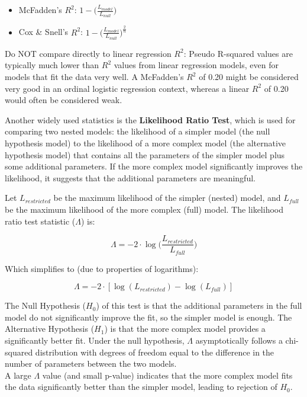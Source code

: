 \documentclass[
  letterpaper,
  DIV=11,
  numbers=noendperiod]{scrartcl}
\begin{document}
\begin{itemize}
\item
  McFadden's \(R^2\): \(1−\Big(\frac{L_{model}}{L_{null}}\Big)\)
\item
  Cox \& Snell's \(R^2\):
  \(1−\Big(\frac{L_{model}}{L_{null}}\Big)^{\frac{2}{n}}\)
\end{itemize}

\begin{tcolorbox}[enhanced jigsaw, opacitybacktitle=0.6, toptitle=1mm, title=\textcolor{quarto-callout-warning-color}{\faExclamationTriangle}\hspace{0.5em}{Warning}, coltitle=black, colframe=quarto-callout-warning-color-frame, titlerule=0mm, breakable, left=2mm, bottomtitle=1mm, arc=.35mm, colback=white, rightrule=.15mm, colbacktitle=quarto-callout-warning-color!10!white, toprule=.15mm, opacityback=0, leftrule=.75mm, bottomrule=.15mm]

Do NOT compare directly to linear regression \(R^2\): Pseudo R-squared
values are typically much lower than \(R^2\) values from linear
regression models, even for models that fit the data very well. A
McFadden's \(R^2\) of 0.20 might be considered very good in an ordinal
logistic regression context, whereas a linear \(R^2\) of 0.20 would
often be considered weak.

\end{tcolorbox}

Another widely used statistics is the \textbf{Likelihood Ratio Test},
which is used for comparing two nested models: the likelihood of a
simpler model (the null hypothesis model) to the likelihood of a more
complex model (the alternative hypothesis model) that contains all the
parameters of the simpler model plus some additional parameters. If the
more complex model significantly improves the likelihood, it suggests
that the additional parameters are meaningful.

Let \(L_{restricted}\) be the maximum likelihood of the simpler (nested)
model, and \(L_{full}\) be the maximum likelihood of the more complex
(full) model. The likelihood ratio test statistic (\(\Lambda\)) is:

\[
\Lambda = - 2 \cdot \log \Bigg(\frac{L_{restricted}}{L_{full}}\Bigg)
\]

Which simplifies to (due to properties of logarithms):

\[
\Lambda = -2 \cdot [\log(L_{restricted})-\log(L_{full})]
\]

The Null Hypothesis (\(H_0\)) of this test is that the additional
parameters in the full model do not significantly improve the fit, so
the simpler model is enough. The Alternative Hypothesis (\(H_1\)) is
that the more complex model provides a significantly better fit. Under
the null hypothesis, \(\Lambda\) asymptotically follows a chi-squared
distribution with degrees of freedom equal to the difference in the
number of parameters between the two models.\\
A large \(\Lambda\) value (and small p-value) indicates that the more
complex model fits the data significantly better than the simpler model,
leading to rejection of \(H_0\).
\end{document}
